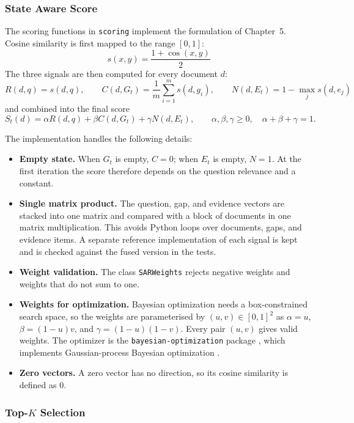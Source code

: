 \documentclass[12pt,a4paper]{report}
\begin{document}
\subsubsection{State Aware Score}

The scoring functions in \texttt{scoring} implement the formulation of Chapter~5. Cosine similarity is first mapped to the range $[0,1]$:
\[
s(x,y)=\frac{1+\cos(x,y)}{2}
\]
The three signals are then computed for every document $d$:
\[
R(d,q)=s(d,q),\qquad
C(d,G_t)=\frac{1}{m}\sum_{i=1}^{m}s(d,g_i),\qquad
N(d,E_t)=1-\max_{j}s(d,e_j)
\]
and combined into the final score
\[
S_t(d)=\alpha R(d,q)+\beta C(d,G_t)+\gamma N(d,E_t),
\qquad \alpha,\beta,\gamma\ge 0,\quad \alpha+\beta+\gamma=1.
\]

The implementation handles the following details:

\begin{itemize}[leftmargin=0.30in,itemsep=0.06in]
\item \textbf{Empty state.} When $G_t$ is empty, $C=0$; when $E_t$ is empty, $N=1$. At the first iteration the score therefore depends on the question relevance and a constant.
\item \textbf{Single matrix product.} The question, gap, and evidence vectors are stacked into one matrix and compared with a block of documents in one matrix multiplication. This avoids Python loops over documents, gaps, and evidence items. A separate reference implementation of each signal is kept and is checked against the fused version in the tests.
\item \textbf{Weight validation.} The class \texttt{SARWeights} rejects negative weights and weights that do not sum to one.
\item \textbf{Weights for optimization.} Bayesian optimization needs a box-constrained search space, so the weights are parameterised by $(u,v)\in[0,1]^2$ as $\alpha=u$, $\beta=(1-u)v$, and $\gamma=(1-u)(1-v)$. Every pair $(u,v)$ gives valid weights. The optimizer is the \texttt{bayesian-optimization} package \cite{nogueira2014bayesopt}, which implements Gaussian-process Bayesian optimization \cite{snoek2012practical}.
\item \textbf{Zero vectors.} A zero vector has no direction, so its cosine similarity is defined as 0.
\end{itemize}

\subsubsection{Top-$K$ Selection}
\end{document}
